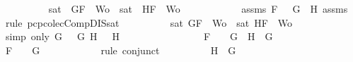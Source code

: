 \begin{isabellebody}
\ \ \ \ \ \ \ \ \isamarkupfalse%
\ {\isachardoublequoteopen}sat\ {\isacharparenleft}{\isacharbraceleft}\isactrlbold {\isasymnot}\ G{}{\isacharcomma}F{\isacharbraceright}\ {\isasymunion}\ Wo{\isacharparenright}\ {\isasymor}\ sat\ {\isacharparenleft}{\isacharbraceleft}\isactrlbold {\isasymnot}\ H{}{\isacharcomma}F{\isacharbraceright}\ {\isasymunion}\ Wo{\isacharparenright}{\isachardoublequoteclose}\isanewline
\ \ \ \ \ \ \ \ \ \ \isamarkupfalse%
\ assms{\isacharparenleft}{}{\isacharparenright}\ {\isacartoucheopen}F\ {\isacharequal}\ \isactrlbold {\isasymnot}\ {\isacharparenleft}G{}\ \isactrlbold {\isasymand}\ H{}{\isacharparenright}{\isacartoucheclose}\ assms{\isacharparenleft}{}{\isacharcomma}{}{\isacharcomma}{}{\isacharparenright}\ \isamarkupfalse%
\ {\isacharparenleft}rule\ pcp{\isacharunderscore}colecComp{\isacharunderscore}DIS{\isacharunderscore}sat{}{\isacharparenright}\isanewline
\ \ \ \ \ \ \ \ \isamarkupfalse%
\ {\isachardoublequoteopen}sat\ {\isacharparenleft}{\isacharbraceleft}G{\isacharcomma}F{\isacharbraceright}\ {\isasymunion}\ Wo{\isacharparenright}\ {\isasymor}\ sat\ {\isacharparenleft}{\isacharbraceleft}H{\isacharcomma}F{\isacharbraceright}\ {\isasymunion}\ Wo{\isacharparenright}{\isachardoublequoteclose}\isanewline
\ \ \ \ \ \ \ \ \ \ \isamarkupfalse%
\ {\isacharparenleft}simp\ only{\isacharcolon}\ {\isacartoucheopen}G\ {\isacharequal}\ \isactrlbold {\isasymnot}\ G{}{\isacartoucheclose}\ {\isacartoucheopen}H\ {\isacharequal}\ \isactrlbold {\isasymnot}\ H{}{\isacartoucheclose}{\isacharparenright}\isanewline
\ \ \ \ \ \ \isamarkupfalse%
\isanewline
\ \ \ \ \ \ \ \ \isamarkupfalse%
\ {\isachardoublequoteopen}F\ {\isacharequal}\ \isactrlbold {\isasymnot}\ {\isacharparenleft}\isactrlbold {\isasymnot}\ G{\isacharparenright}\ {\isasymand}\ H\ {\isacharequal}\ G{\isachardoublequoteclose}\isanewline
\ \ \ \ \ \ \ \ \isamarkupfalse%
\ \isamarkupfalse%
\ {\isachardoublequoteopen}F\ {\isacharequal}\ \isactrlbold {\isasymnot}\ {\isacharparenleft}\isactrlbold {\isasymnot}\ G{\isacharparenright}{\isachardoublequoteclose}\isanewline
\ \ \ \ \ \ \ \ \ \ \isamarkupfalse%
\ {\isacharparenleft}rule\ conjunct{}{\isacharparenright}\isanewline
\ \ \ \ \ \ \ \ \isamarkupfalse%
\ {\isachardoublequoteopen}H\ {\isacharequal}\ G{\isachardoublequoteclose}\isanewline

\end{isabellebody}
